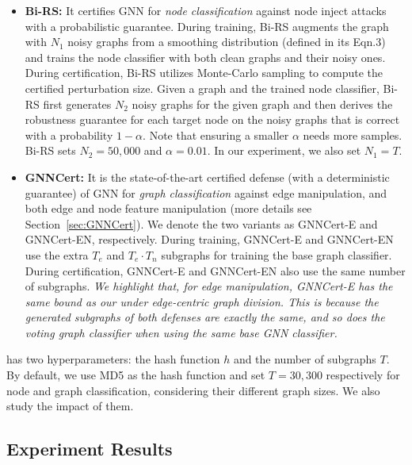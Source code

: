 \begin{itemize}[leftmargin=*]

\vspace{-2mm}
\item {\bf Bi-RS:} It certifies 
GNN for \emph{node classification} against node inject attacks with a probabilistic guarantee. 
During training, 
Bi-RS augments the graph with 
$N_1$ noisy graphs from a smoothing distribution (defined in its Eqn.3) and trains the node classifier with both clean graphs and their noisy ones. 
During certification, Bi-RS utilizes Monte-Carlo sampling to compute the certified perturbation size. Given 
a graph and the trained node classifier, Bi-RS first generates $N_2$ noisy graphs for the given graph and then derives the robustness guarantee for each target node on the noisy graphs that is correct with a probability $1-\alpha$. 
Note that ensuring a smaller $\alpha$ needs more samples.
Bi-RS sets $N_2=50,000$ and $\alpha=0.01$. In our experiment, 
we also set $N_1=T$.  


\vspace{-2mm}
\item {\bf GNNCert:} It is the state-of-the-art certified defense (with a deterministic guarantee) of GNN for \emph{graph classification} against edge manipulation, and both edge  and node feature manipulation (more details see Section~\ref{sec:GNNCert}). 
We denote the two variants as GNNCert-E and GNNCert-EN, respectively. 
During training,  GNNCert-E and  GNNCert-EN use the extra $T_e$ and $T_e \cdot T_n$ subgraphs for training the base graph classifier. During certification, GNNCert-E and  GNNCert-EN also use the same number of subgraphs.  
\emph{We highlight that, for edge manipulation, GNNCert-E has the same bound as our {\nameE} under edge-centric graph division. This is because the generated subgraphs of both defenses are exactly the same, and so does the voting graph classifier when using the same base GNN classifier.}  

\end{itemize}

\vspace{+0.05in}
 {\name} has two hyperparameters: the hash function $h$ and the number of subgraphs $T$. By default, we use MD5 as the hash function and set $T=30,300$ respectively for node and graph classification, considering their different graph sizes. 
 We also study the impact of them. 




\subsection{Experiment Results}

